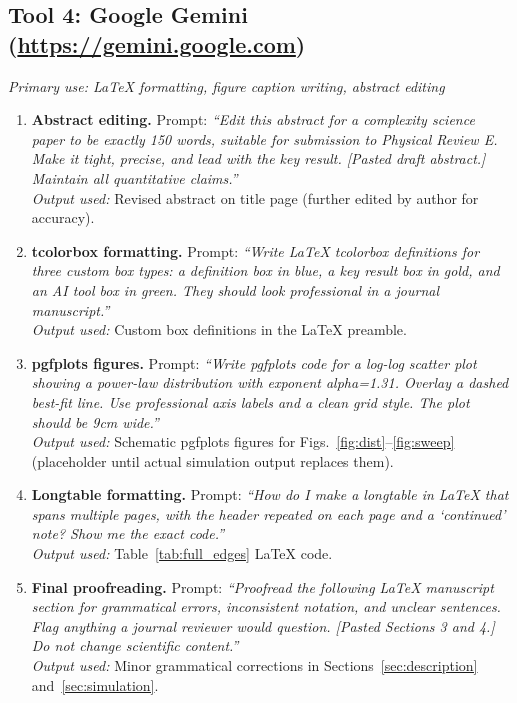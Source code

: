 \documentclass[12pt, a4paper]{article}
\begin{document}
\subsection*{Tool 4: Google Gemini
(\url{https://gemini.google.com})}
\textit{Primary use: LaTeX formatting, figure caption writing,
abstract editing}

\begin{enumerate}[label=\textbf{Gm\arabic*.}, leftmargin=*, itemsep=6pt]

  \item \textbf{Abstract editing.}
  Prompt: \textit{``Edit this abstract for a complexity science
  paper to be exactly 150 words, suitable for submission to
  Physical Review E. Make it tight, precise, and lead with
  the key result. [Pasted draft abstract.] Maintain all
  quantitative claims.''}\\
  \textit{Output used:} Revised abstract on title page
  (further edited by author for accuracy).

  \item \textbf{tcolorbox formatting.}
  Prompt: \textit{``Write LaTeX tcolorbox definitions for
  three custom box types: a definition box in blue,
  a key result box in gold, and an AI tool box in green.
  They should look professional in a journal manuscript.''}\\
  \textit{Output used:} Custom box definitions in the
  LaTeX preamble.

  \item \textbf{pgfplots figures.}
  Prompt: \textit{``Write pgfplots code for a log-log scatter
  plot showing a power-law distribution with exponent alpha=1.31.
  Overlay a dashed best-fit line. Use professional axis labels
  and a clean grid style. The plot should be 9cm wide.''}\\
  \textit{Output used:} Schematic pgfplots figures for
  Figs.~\ref{fig:dist}--\ref{fig:sweep} (placeholder until
  actual simulation output replaces them).

  \item \textbf{Longtable formatting.}
  Prompt: \textit{``How do I make a longtable in LaTeX that
  spans multiple pages, with the header repeated on each page
  and a `continued' note? Show me the exact code.''}\\
  \textit{Output used:} Table~\ref{tab:full_edges} LaTeX code.

  \item \textbf{Final proofreading.}
  Prompt: \textit{``Proofread the following LaTeX manuscript
  section for grammatical errors, inconsistent notation, and
  unclear sentences. Flag anything a journal reviewer would
  question. [Pasted Sections 3 and 4.] Do not change scientific
  content.''}\\
  \textit{Output used:} Minor grammatical corrections in
  Sections~\ref{sec:description} and~\ref{sec:simulation}.

\end{enumerate}
\end{document}
